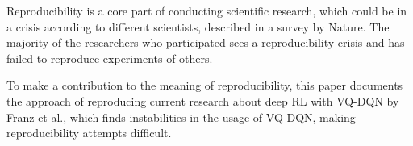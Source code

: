 Reproducibility is a core part of conducting scientific research, which could be in a crisis according to different scientists, described in a survey by Nature.
The majority of the researchers who participated sees a reproducibility crisis and has failed to reproduce experiments of others.\autocite{crisis}

To make a contribution to the meaning of reproducibility, this paper documents the approach of reproducing current research about deep \ac{RL} with \ac{VQ-DQN} by Franz et al.\autocite{instabilities}, which finds instabilities in the usage of \ac{VQ-DQN}, making reproducibility attempts difficult.

